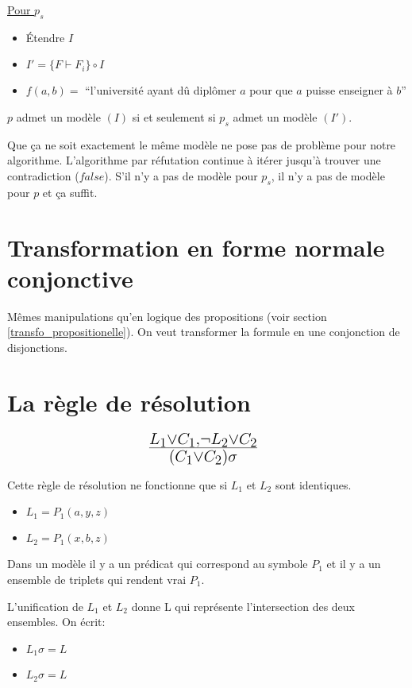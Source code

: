 \vspace{5 mm}

\underline{Pour $p_s$}
\begin{itemize}
  \item Étendre $I$
  \item $I' = \big\{ F \vdash F_i \big\} \circ I$
  \item $f(a,b) = $ ``l'université ayant dû diplômer $a$ pour que $a$ puisse enseigner à $b$''
\end{itemize}

\vspace{5 mm}
$p$ admet un modèle $(I)$ si et seulement si $p_s$ admet un modèle $(I')$.

Que ça ne soit exactement le même modèle ne pose pas de problème pour notre algorithme. L'algorithme par réfutation continue à itérer jusqu'à trouver une contradiction ($false$). S'il n'y a pas de modèle pour $p_s$, il n'y a pas de modèle pour $p$ et ça suffit.

\section{Transformation en forme normale conjonctive}

Mêmes manipulations qu'en logique des propositions (voir section \ref{transfo_propositionelle}). On veut transformer la formule en une conjonction de disjonctions.

\section{La règle de résolution}

$$ \mbox{\huge $\frac{L_1 \vee C_1, \neg L_2 \vee C_2}{(C_1 \vee C_2)\sigma}$ } $$

Cette règle de résolution ne fonctionne que si $L_1$ et $L_2$ sont identiques.

\begin{itemize}
  \item $L_1 = P_1(a, y, z)$
  \item $L_2 = P_1(x, b, z)$
\end{itemize}

Dans un modèle il y a un prédicat qui correspond au symbole $P_1$ et il y a un ensemble de triplets qui rendent vrai $P_1$.

L'unification de $L_1$ et $L_2$ donne L qui représente l'intersection des deux ensembles. On écrit:
\begin{itemize}
  \item $L_1 \sigma = L$
  \item $L_2 \sigma = L$
\end{itemize}

